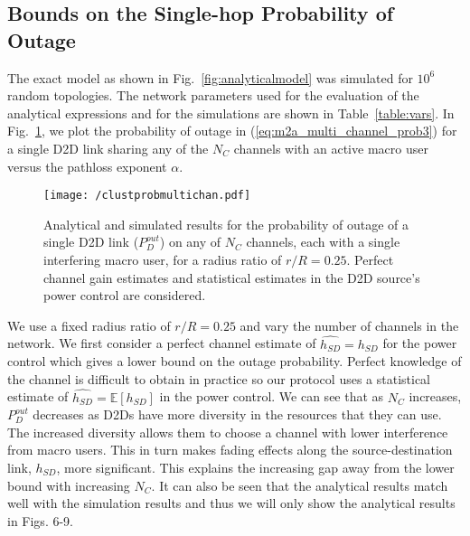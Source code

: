 \documentclass[10pt, final, journal, letterpaper,oneside, twocolumn]{IEEEtran}
\begin{document}
\subsection{Bounds on the Single-hop Probability of Outage}
The exact model as shown in Fig.~\ref{fig:analyticalmodel} was simulated for $10^6$ random topologies.  The network parameters used for the evaluation of the analytical expressions and for the simulations are shown in Table~\ref{table:vars}.  In Fig.~\ref{fig:clustprobmultichan}, we plot the probability of outage in (\ref{eq:m2a_multi_channel_prob3}) for a single D2D link sharing any of the $N_C$ channels with an active macro user versus the pathloss exponent $\alpha$.
\begin{figure}[htp]
\center
 \texttt{[image: /clustprobmultichan.pdf]}
  \caption[]{Analytical and simulated results for the probability of outage of a single D2D link ($P^{out}_{D}$) on any of $N_C$ channels, each with a single interfering macro user, for a radius ratio of $r/R = 0.25$. Perfect channel gain estimates and statistical estimates in the D2D source's power control are considered. } 
  \label{fig:clustprobmultichan}
\end{figure}
We use a fixed radius ratio of ${r}/{R} = 0.25$ and vary the number of channels in the network.  We first consider a perfect channel estimate of $\widehat{h_{SD}}=h_{SD}$ for the power control which gives a lower bound on the outage probability.  Perfect knowledge of the channel is difficult to obtain in practice so our protocol uses a statistical estimate of $\widehat{h_{SD}}=\mathbb{E}[h_{SD}]$ in the power control.  We can see that as $N_C$ increases, $P^{out}_{D}$ decreases as D2Ds have more diversity in the resources that they can use.  The increased diversity allows them to choose a channel with lower interference from macro users.  This in turn makes fading effects along the source-destination link, $h_{SD}$, more significant.  This explains the increasing gap away from the lower bound with increasing $N_C$.  It can also be seen that the analytical results match well with the simulation results and thus we will only show the analytical results in Figs. 6-9.  
\end{document}
